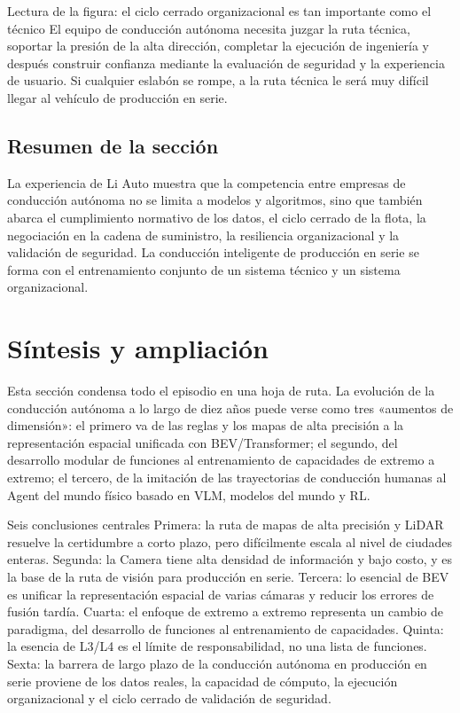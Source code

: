 \documentclass[a4paper]{article}
\begin{document}
\begin{knowledgebox}{Lectura de la figura: el ciclo cerrado organizacional es tan importante como el técnico}
El equipo de conducción autónoma necesita juzgar la ruta técnica, soportar la presión de la alta dirección, completar la ejecución de ingeniería y después construir confianza mediante la evaluación de seguridad y la experiencia de usuario. Si cualquier eslabón se rompe, a la ruta técnica le será muy difícil llegar al vehículo de producción en serie.
\end{knowledgebox}

\subsection{Resumen de la sección}

La experiencia de Li Auto muestra que la competencia entre empresas de conducción autónoma no se limita a modelos y algoritmos, sino que también abarca el cumplimiento normativo de los datos, el ciclo cerrado de la flota, la negociación en la cadena de suministro, la resiliencia organizacional y la validación de seguridad. La conducción inteligente de producción en serie se forma con el entrenamiento conjunto de un sistema técnico y un sistema organizacional.
\section{Síntesis y ampliación}

Esta sección condensa todo el episodio en una hoja de ruta. La evolución de la conducción autónoma a lo largo de diez años puede verse como tres «aumentos de dimensión»: el primero va de las reglas y los mapas de alta precisión a la representación espacial unificada con BEV/Transformer; el segundo, del desarrollo modular de funciones al entrenamiento de capacidades de extremo a extremo; el tercero, de la imitación de las trayectorias de conducción humanas al Agent del mundo físico basado en VLM, modelos del mundo y RL.

\begin{importantbox}{Seis conclusiones centrales}
Primera: la ruta de mapas de alta precisión y LiDAR resuelve la certidumbre a corto plazo, pero difícilmente escala al nivel de ciudades enteras. Segunda: la Camera tiene alta densidad de información y bajo costo, y es la base de la ruta de visión para producción en serie. Tercera: lo esencial de BEV es unificar la representación espacial de varias cámaras y reducir los errores de fusión tardía. Cuarta: el enfoque de extremo a extremo representa un cambio de paradigma, del desarrollo de funciones al entrenamiento de capacidades. Quinta: la esencia de L3/L4 es el límite de responsabilidad, no una lista de funciones. Sexta: la barrera de largo plazo de la conducción autónoma en producción en serie proviene de los datos reales, la capacidad de cómputo, la ejecución organizacional y el ciclo cerrado de validación de seguridad.
\end{importantbox}
\end{document}
